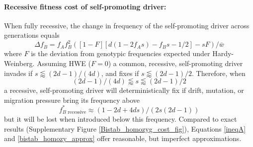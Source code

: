 \documentclass[12pt,letterpaper]{article}
\newcommand{\gc}[1]{{ \color{red} #1}}
\begin{document}
\paragraph{Recessive fitness cost of self-promoting driver:} %
When fully recessive, the change in frequency of the self-promoting driver across generations equals 
\begin{equation}
\Delta f_B=f_A f_B^2 \left( [1-F][ d(1-2 f_A s) - f_B s-1/2] - s  F \right)/\bar{w}
\label{deltadriver}
\end{equation}
where $F$ is the deviation from genotypic frequencies expected under Hardy-Weinberg. %
Assuming HWE  ($F=0$) a common, recessive, self-promoting driver invades if $s\lessapprox(2 d - 1)/(4 d)$, and fixes if
 $s\lessapprox(2d-1)/2$. 
 Therefore, when 
\begin{equation}
(2 d - 1)/(4 d)  \lessapprox  s  \lessapprox  (2d-1)/2\label{ineqA}
\end{equation} 
a recessive, self-promoting driver will deterministically fix if drift,
 	mutation, or migration pressure bring its frequency above
\begin{equation} 
f^*_{B\text{ recessive}} \approx (1-2d+4ds)/(2s(2d-1)) \label{bistab_homozy_approx}
\end{equation}
 but it will be lost when introduced below this frequency. 
Compared to exact results (Supplementary Figure \ref{Bistab_homozyg_cost_fig}), Equations
 \eqref{ineqA} and \eqref{bistab_homozy_approx} offer reasonable, but imperfect approximations. 
\end{document}
